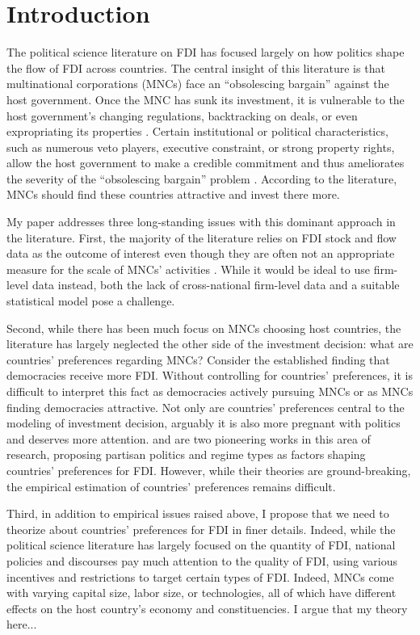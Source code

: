 \section{Introduction}
\label{sec:introduction}

The political science literature on FDI has focused largely on how politics shape the flow of FDI across countries. The central insight of this literature is that multinational corporations (MNCs) face an ``obsolescing bargain'' against the host government. Once the MNC has sunk its investment, it is vulnerable to the host government's changing regulations, backtracking on deals, or even expropriating its properties \citep{Li2009a, Sawant2010}. Certain institutional or political characteristics, such as numerous veto players, executive constraint, or strong property rights, allow the host government to make a credible commitment and thus ameliorates the severity of the ``obsolescing bargain'' problem \citep{Busse2007, Jensen2014, Li2003}. According to the literature, MNCs should find these countries attractive and invest there more.

My paper addresses three long-standing issues with this dominant approach in the literature. First, the majority of the literature relies on FDI stock and flow data as the outcome of interest even though they are often not an appropriate measure for the scale of MNCs' activities \citep{Kerner2014}. While it would be ideal to use firm-level data instead, both the lack of cross-national firm-level data and a suitable statistical model pose a challenge.

Second, while there has been much focus on MNCs choosing host countries, the literature has largely neglected the other side of the investment decision: what are countries' preferences regarding MNCs? Consider the established finding that democracies receive more FDI. Without controlling for countries' preferences, it is difficult to interpret this fact as democracies actively pursuing MNCs or as MNCs finding democracies attractive. Not only are countries' preferences central to the modeling of investment decision, arguably it is also more pregnant with politics and deserves more attention. \citet{Pinto2013} and \citet{Pandya2016} are two pioneering works in this area of research, proposing partisan politics and regime types as factors shaping countries' preferences for FDI. However, while their theories are ground-breaking, the empirical estimation of countries' preferences remains difficult.

Third, in addition to empirical issues raised above, I propose that we need to theorize about countries' preferences for FDI in finer details. Indeed, while the political science literature has largely focused on the quantity of FDI, national policies and discourses pay much attention to the quality of FDI, using various incentives and restrictions to target certain types of FDI. Indeed, MNCs come with varying capital size, labor size, or technologies, all of which have different effects on the host country's economy and constituencies. I argue that {\color{red}my theory here...}

